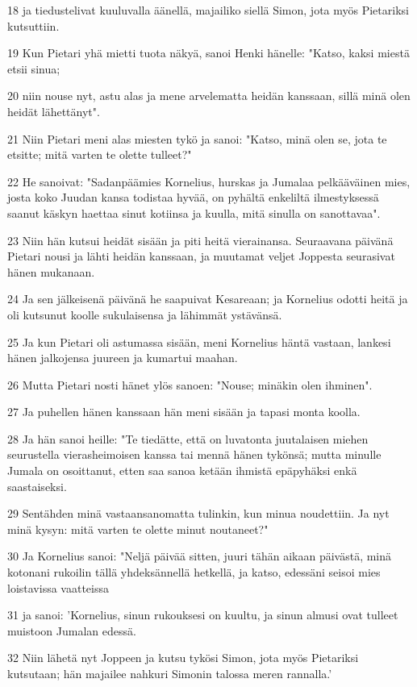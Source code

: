 \par 18 ja tiedustelivat kuuluvalla äänellä, majailiko siellä Simon, jota myös Pietariksi kutsuttiin.
\par 19 Kun Pietari yhä mietti tuota näkyä, sanoi Henki hänelle: "Katso, kaksi miestä etsii sinua;
\par 20 niin nouse nyt, astu alas ja mene arvelematta heidän kanssaan, sillä minä olen heidät lähettänyt".
\par 21 Niin Pietari meni alas miesten tykö ja sanoi: "Katso, minä olen se, jota te etsitte; mitä varten te olette tulleet?"
\par 22 He sanoivat: "Sadanpäämies Kornelius, hurskas ja Jumalaa pelkääväinen mies, josta koko Juudan kansa todistaa hyvää, on pyhältä enkeliltä ilmestyksessä saanut käskyn haettaa sinut kotiinsa ja kuulla, mitä sinulla on sanottavaa".
\par 23 Niin hän kutsui heidät sisään ja piti heitä vierainansa. Seuraavana päivänä Pietari nousi ja lähti heidän kanssaan, ja muutamat veljet Joppesta seurasivat hänen mukanaan.
\par 24 Ja sen jälkeisenä päivänä he saapuivat Kesareaan; ja Kornelius odotti heitä ja oli kutsunut koolle sukulaisensa ja lähimmät ystävänsä.
\par 25 Ja kun Pietari oli astumassa sisään, meni Kornelius häntä vastaan, lankesi hänen jalkojensa juureen ja kumartui maahan.
\par 26 Mutta Pietari nosti hänet ylös sanoen: "Nouse; minäkin olen ihminen".
\par 27 Ja puhellen hänen kanssaan hän meni sisään ja tapasi monta koolla.
\par 28 Ja hän sanoi heille: "Te tiedätte, että on luvatonta juutalaisen miehen seurustella vierasheimoisen kanssa tai mennä hänen tykönsä; mutta minulle Jumala on osoittanut, etten saa sanoa ketään ihmistä epäpyhäksi enkä saastaiseksi.
\par 29 Sentähden minä vastaansanomatta tulinkin, kun minua noudettiin. Ja nyt minä kysyn: mitä varten te olette minut noutaneet?"
\par 30 Ja Kornelius sanoi: "Neljä päivää sitten, juuri tähän aikaan päivästä, minä kotonani rukoilin tällä yhdeksännellä hetkellä, ja katso, edessäni seisoi mies loistavissa vaatteissa
\par 31 ja sanoi: 'Kornelius, sinun rukouksesi on kuultu, ja sinun almusi ovat tulleet muistoon Jumalan edessä.
\par 32 Niin lähetä nyt Joppeen ja kutsu tykösi Simon, jota myös Pietariksi kutsutaan; hän majailee nahkuri Simonin talossa meren rannalla.'
